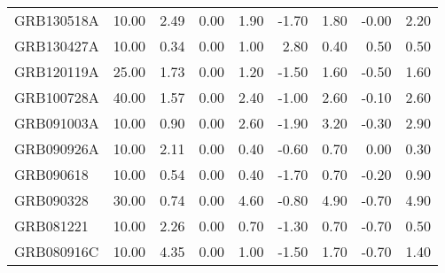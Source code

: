 \begin{tabular}{lrrrrrrrr}
GRB130518A & 10.00 & 2.49 & 0.00 & 1.90 & -1.70 & 1.80 & -0.00 & 2.20 \\
GRB130427A & 10.00 & 0.34 & 0.00 & 1.00 & 2.80 & 0.40 & 0.50 & 0.50 \\
GRB120119A & 25.00 & 1.73 & 0.00 & 1.20 & -1.50 & 1.60 & -0.50 & 1.60 \\
GRB100728A & 40.00 & 1.57 & 0.00 & 2.40 & -1.00 & 2.60 & -0.10 & 2.60 \\
GRB091003A & 10.00 & 0.90 & 0.00 & 2.60 & -1.90 & 3.20 & -0.30 & 2.90 \\
GRB090926A & 10.00 & 2.11 & 0.00 & 0.40 & -0.60 & 0.70 & 0.00 & 0.30 \\
GRB090618 & 10.00 & 0.54 & 0.00 & 0.40 & -1.70 & 0.70 & -0.20 & 0.90 \\
GRB090328 & 30.00 & 0.74 & 0.00 & 4.60 & -0.80 & 4.90 & -0.70 & 4.90 \\
GRB081221 & 10.00 & 2.26 & 0.00 & 0.70 & -1.30 & 0.70 & -0.70 & 0.50 \\
GRB080916C & 10.00 & 4.35 & 0.00 & 1.00 & -1.50 & 1.70 & -0.70 & 1.40 \\
\bottomrule
\end{tabular}
